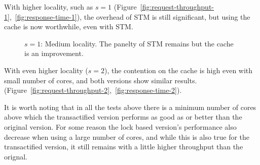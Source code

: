 \documentclass[preprint,11pt]{sigplanconf}
\begin{document}
With higher locality, such as $s=1$
(Figure~\ref{fig:request-throughput-1},~\ref{fig:response-time-1}), the overhead
of STM is still significant, but using the cache is now worthwhile, even with
STM. 

\begin{figure}
 \centering
 \hfill
 \caption{$s = 1$: Medium locality. The panelty of STM remains but the cache is an improvement.}
\end{figure}

With even higher locality ($s=2$), the contention on the cache is high even with
small number of cores, and both versions show similar results.
(Figure~\ref{fig:request-throughput-2},~\ref{fig:response-time-2}).

It is worth noting that in all the tests above there is a minimum number of
cores above which the transactified version performs as good as or better than
the original version. For some reason the lock based version's performance also
decrease when using a large number of cores, and while this is also true for the
transactified version, it still remains with a little higher throughput than the
orignal.
\end{document}
